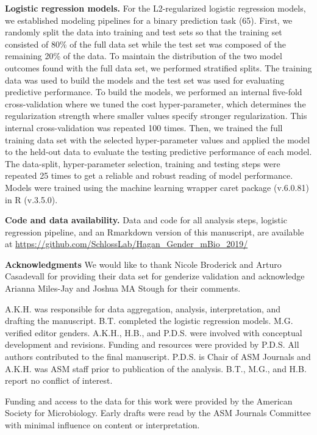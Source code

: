 \documentclass[11pt,]{article}
\begin{document}
\textbf{Logistic regression models.} For the L2-regularized logistic
regression models, we established modeling pipelines for a binary
prediction task (65). First, we randomly split the data into training
and test sets so that the training set consisted of 80\% of the full
data set while the test set was composed of the remaining 20\% of the
data. To maintain the distribution of the two model outcomes found with
the full data set, we performed stratified splits. The training data was
used to build the models and the test set was used for evaluating
predictive performance. To build the models, we performed an internal
five-fold cross-validation where we tuned the cost hyper-parameter,
which determines the regularization strength where smaller values
specify stronger regularization. This internal cross-validation was
repeated 100 times. Then, we trained the full training data set with the
selected hyper-parameter values and applied the model to the held-out
data to evaluate the testing predictive performance of each model. The
data-split, hyper-parameter selection, training and testing steps were
repeated 25 times to get a reliable and robust reading of model
performance. Models were trained using the machine learning wrapper
caret package (v.6.0.81) in R (v.3.5.0).

\textbf{Code and data availability.} Data and code for all analysis
steps, logistic regression pipeline, and an Rmarkdown version of this
manuscript, are available at
\url{https://github.com/SchlossLab/Hagan_Gender_mBio_2019/}

\textbf{Acknowledgments} We would like to thank Nicole Broderick and
Arturo Casadevall for providing their data set for genderize validation
and acknowledge Arianna Miles-Jay and Joshua MA Stough for their
comments.

A.K.H. was responsible for data aggregation, analysis, interpretation,
and drafting the manuscript. B.T. completed the logistic regression
models. M.G. verified editor genders. A.K.H., H.B., and P.D.S. were
involved with conceptual development and revisions. Funding and
resources were provided by P.D.S. All authors contributed to the final
manuscript. P.D.S. is Chair of ASM Journals and A.K.H. was ASM staff
prior to publication of the analysis. B.T., M.G., and H.B. report no
conflict of interest.

Funding and access to the data for this work were provided by the
American Society for Microbiology. Early drafts were read by the ASM
Journals Committee with minimal influence on content or interpretation.
\end{document}
